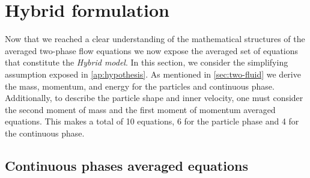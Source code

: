 \section{Hybrid formulation}
\label{sec:hybridchap2}


Now that we reached a clear understanding of the mathematical structures of the averaged two-phase flow equations we now expose the averaged set of equations that constitute the \textit{Hybrid model}. 
In this section, we consider the simplifying assumption exposed in \ref{ap:hypothesis}. 
As mentioned in \ref{sec:two-fluid} we derive the mass, momentum, and energy for the particles and continuous phase. 
Additionally, to describe the particle shape and inner velocity, one must consider the second moment of mass and the first moment of momentum averaged equations. 
This makes a total of 10 equations, 6 for the particle phase and 4 for the continuous phase.



\subsection{Continuous phases averaged equations}


